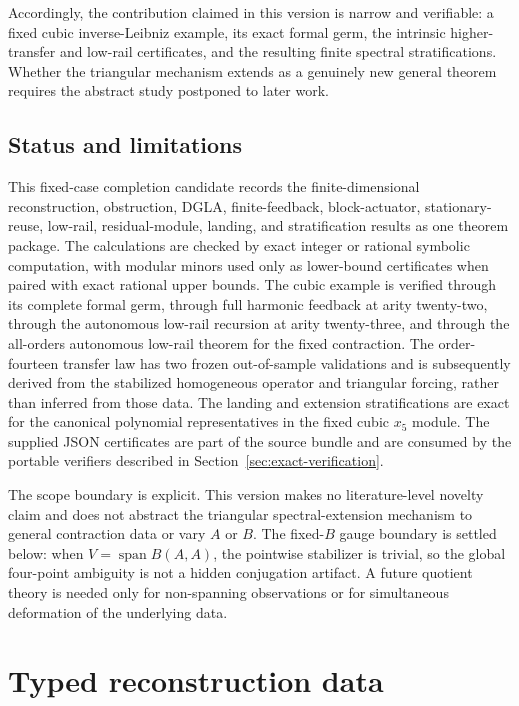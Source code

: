 \documentclass[11pt]{amsart}
\newcommand{\Span}{\operatorname{span}}
\begin{document}
Accordingly, the contribution claimed in this version is narrow and verifiable: a fixed cubic inverse-Leibniz example, its exact formal germ, the intrinsic higher-transfer and low-rail certificates, and the resulting finite spectral stratifications.  Whether the triangular mechanism extends as a genuinely new general theorem requires the abstract study postponed to later work.

\subsection*{Status and limitations}
This fixed-case completion candidate records the finite-dimensional reconstruction, obstruction, DGLA, finite-feedback, block-actuator, stationary-reuse, low-rail, residual-module, landing, and stratification results as one theorem package.  The calculations are checked by exact integer or rational symbolic computation, with modular minors used only as lower-bound certificates when paired with exact rational upper bounds.  The cubic example is verified through its complete formal germ, through full harmonic feedback at arity twenty-two, through the autonomous low-rail recursion at arity twenty-three, and through the all-orders autonomous low-rail theorem for the fixed contraction.  The order-fourteen transfer law has two frozen out-of-sample validations and is subsequently derived from the stabilized homogeneous operator and triangular forcing, rather than inferred from those data.  The landing and extension stratifications are exact for the canonical polynomial representatives in the fixed cubic $x_5$ module.  The supplied JSON certificates are part of the source bundle and are consumed by the portable verifiers described in Section~\ref{sec:exact-verification}.

The scope boundary is explicit.  This version makes no literature-level novelty claim and does not abstract the triangular spectral-extension mechanism to general contraction data or vary $A$ or $B$.  The fixed-$B$ gauge boundary is settled below: when $V=\Span B(A,A)$, the pointwise stabilizer is trivial, so the global four-point ambiguity is not a hidden conjugation artifact.  A future quotient theory is needed only for non-spanning observations or for simultaneous deformation of the underlying data.

\section{Typed reconstruction data}
\end{document}
